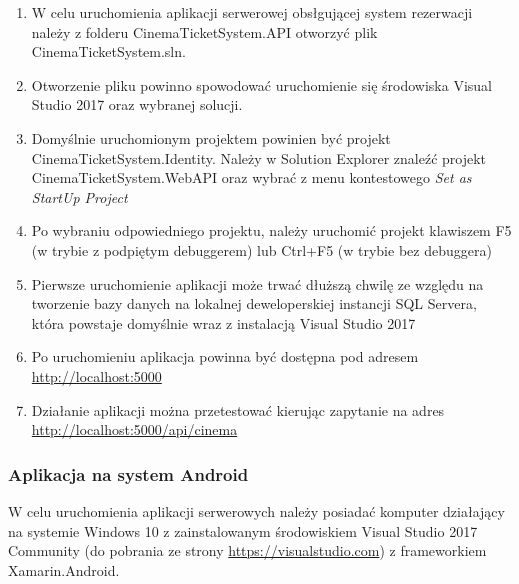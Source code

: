 \begin{enumerate}
\item W celu uruchomienia aplikacji serwerowej obsłgującej system rezerwacji należy z folderu CinemaTicketSystem.API otworzyć plik CinemaTicketSystem.sln.
\item Otworzenie pliku powinno spowodować uruchomienie się środowiska Visual Studio 2017 oraz wybranej solucji.
\item Domyślnie uruchomionym projektem powinien być projekt CinemaTicketSystem.Identity. Należy w Solution Explorer znaleźć projekt CinemaTicketSystem.WebAPI oraz wybrać z menu kontestowego \textit{Set as StartUp Project}
\item Po wybraniu odpowiedniego projektu, należy uruchomić projekt klawiszem F5 (w trybie z podpiętym debuggerem) lub Ctrl+F5 (w trybie bez debuggera)
\item Pierwsze uruchomienie aplikacji może trwać dłuższą chwilę ze względu na tworzenie bazy danych na lokalnej deweloperskiej instancji SQL Servera, która powstaje domyślnie wraz z instalacją Visual Studio 2017
\item Po uruchomieniu aplikacja powinna być dostępna pod adresem \url{http://localhost:5000}
\item Działanie aplikacji można przetestować kierując zapytanie na adres \url{http://localhost:5000/api/cinema}
\end{enumerate}

\subsubsection*{Aplikacja na system Android}
W celu uruchomienia aplikacji serwerowych należy posiadać komputer działający na systemie Windows 10 z zainstalowanym środowiskiem Visual Studio 2017 Community (do pobrania ze strony \url{https://visualstudio.com}) z frameworkiem Xamarin.Android.

